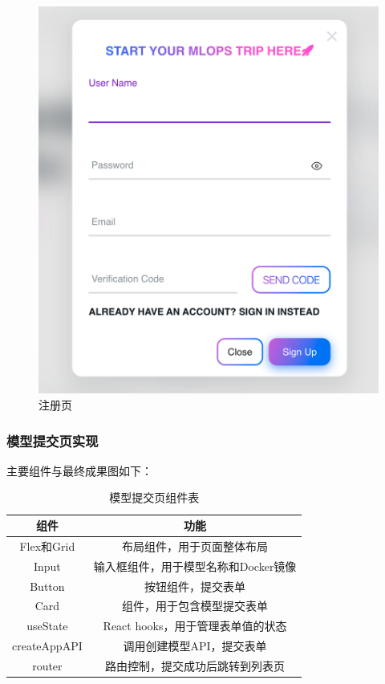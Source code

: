 \documentclass{HDU-Bachelor-Thesis}
\begin{document}
\begin{figure}[H] %
\centering %
\includegraphics[width=1\textwidth]{P-4.png} %
\caption{注册页} %
\label{图片.register} %
\end{figure}

\subsubsection{模型提交页实现}

主要组件与最终成果图如下：

\begin{table}[htbp] 
\caption{模型提交页组件表}   
\label{table:submit}
\centering
\begin{tabular}{c|c}
\hline
\textbf{组件} & \textbf{功能}\\ 
\hline
Flex和Grid & 布局组件，用于页面整体布局\\
\hline
Input & 输入框组件，用于模型名称和Docker镜像\\
\hline  
Button & 按钮组件，提交表单\\ 
\hline
Card & 组件，用于包含模型提交表单\\
\hline
useState & React hooks，用于管理表单值的状态\\
\hline 
createAppAPI & 调用创建模型API，提交表单\\
\hline
router & 路由控制，提交成功后跳转到列表页\\
\hline 
\end{tabular}
\end{table}
\end{document}
